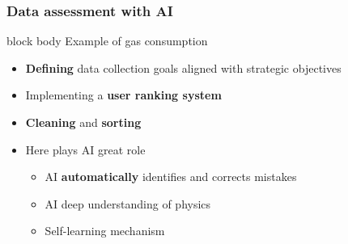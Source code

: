 \documentclass{beamer}
\newenvironment{poznamka}{\begin{beamercolorbox}[rounded=true,shadow=false]{block body}}{\end{beamercolorbox}}
\begin{document}
\begin{frame}[fragile=singleslide]\frametitle{Data assessment with AI}
\begin{poznamka}
Example of gas consumption
\end{poznamka}

\begin{itemize}
\item {\textbf{Defining} data collection
goals aligned with strategic objectives}
\item{Implementing a \textbf{user ranking system}}
\item{\textbf{Cleaning} and \textbf{sorting}}
\item Here plays AI great role
\begin{itemize}
	\item AI \textbf{automatically} identifies and corrects mistakes
	\item AI deep understanding of physics
	\item Self-learning mechanism
	\end{itemize}

\end{itemize}
\end{frame}
\end{document}
